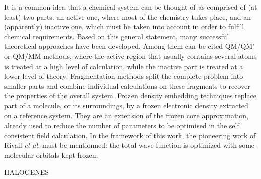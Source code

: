 \documentclass[12pt]{article}
\begin{document}
It is a common idea that a chemical system can be thought of as comprised of (at least) 
two parts:
an active one, where most of the chemistry takes place, and an (apparently) inactive
one, which must be taken into account in order to fulfill chemical requirements.
Based on this general statement, many successful theoretical approaches have been developed.
Among them can be cited QM/QM' or QM/MM methods, where 
the active region that usually contains several atoms is
treated at a high level of calculation, while the inactive part is treated at a 
lower level of theory.\cite{chung_oniom_2015,
ihrig_specific_2011,
zhang_pseudobond_1998,
dilabio_simple_2002,
dilabio_efficient_2005,
gao_generalized_1998,
assfeld_quantum_1996,
jacob_calculation_2006,
von_lilienfeld_variational_2004,
von_lilienfeld_performance_2005,
von_lilienfeld_optimization_2004,
goedecker_separable_1996,
hartwigsen_relativistic_1998,
singh_combined_1986,
zhang_pseudobond_1998-1,
zhang_improved_2004,
parks_pseudobond_2008,
dilabio_simple_2002-1,
hitzenberger_optimizing_2016,
hitzenberger_probing_2015,
collins_energy-based_2015,
pezeshki_recent_2015,
von_lilienfeld_force_2013}%
Fragmentation methods split the complete problem into smaller parts and combine individual calculations
on these fragments to recover the properties of the overall system.\cite{gordon_effective_2001,steinmann_effective_2012}
Frozen density embedding techniques replace part of a molecule, or 
its surroundings,
by a frozen electronic density extracted on a reference system.\cite{wesolowski_frozen-density_2015}
They are an extension of the frozen core approximation, already used to reduce
the number of parameters to be optimised in the self consistent field calculation.
In the framework of this work, the pioneering work of Rivail \emph{et al.} must be mentionned:
the total wave function is optimized with some molecular orbitals kept frozen.\cite{ASSFELD1996100}

HALOGENES
\end{document}
